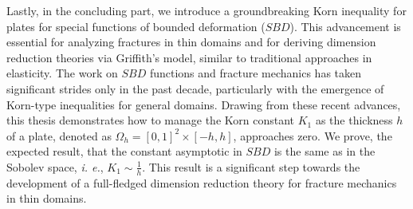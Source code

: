 Lastly, in the concluding part, we introduce a groundbreaking Korn inequality for plates for special functions of bounded deformation ($SBD$). This advancement is essential for analyzing fractures in thin domains and for deriving dimension reduction theories via Griffith’s model, similar to traditional approaches in elasticity. The work on $SBD$ functions and fracture mechanics has taken significant strides only in the past decade, particularly with the emergence of Korn-type inequalities for general domains.  Drawing from these recent advances, this thesis demonstrates how to manage the Korn constant $K_1$ as the thickness $h$ of a plate, denoted as $\Omega_h = [0,1]^2 \times [-h,h]$, approaches zero. We prove, the expected result, that the constant asymptotic in $SBD$ is the same as in the Sobolev space, \textit{i. e.}, $K_1 \sim \frac{1}{h}$. This result is a significant step towards the development of a full-fledged dimension reduction theory for fracture mechanics in thin domains.
